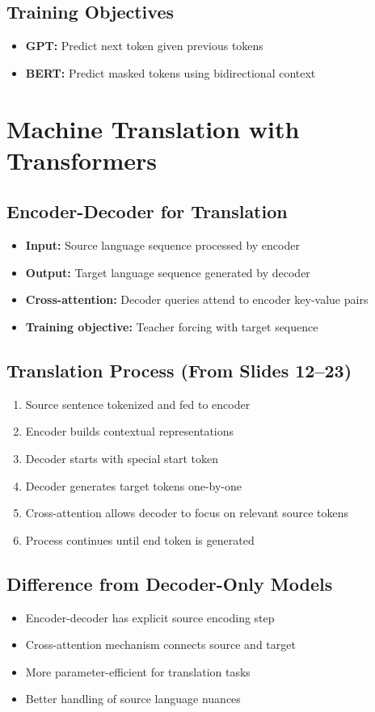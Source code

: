 \subsection*{Training Objectives}
\begin{itemize}
    \item \textbf{GPT:} Predict next token given previous tokens
    \item \textbf{BERT:} Predict masked tokens using bidirectional context
\end{itemize}
\section{Machine Translation with Transformers}

\subsection*{Encoder-Decoder for Translation}
\begin{itemize}
    \item \textbf{Input:} Source language sequence processed by encoder
    \item \textbf{Output:} Target language sequence generated by decoder
    \item \textbf{Cross-attention:} Decoder queries attend to encoder key-value pairs
    \item \textbf{Training objective:} Teacher forcing with target sequence
\end{itemize}

\subsection*{Translation Process (From Slides 12--23)}
\begin{enumerate}
    \item Source sentence tokenized and fed to encoder
    \item Encoder builds contextual representations
    \item Decoder starts with special start token
    \item Decoder generates target tokens one-by-one
    \item Cross-attention allows decoder to focus on relevant source tokens
    \item Process continues until end token is generated
\end{enumerate}

\subsection*{Difference from Decoder-Only Models}
\begin{itemize}
    \item Encoder-decoder has explicit source encoding step
    \item Cross-attention mechanism connects source and target
    \item More parameter-efficient for translation tasks
    \item Better handling of source language nuances
\end{itemize}

